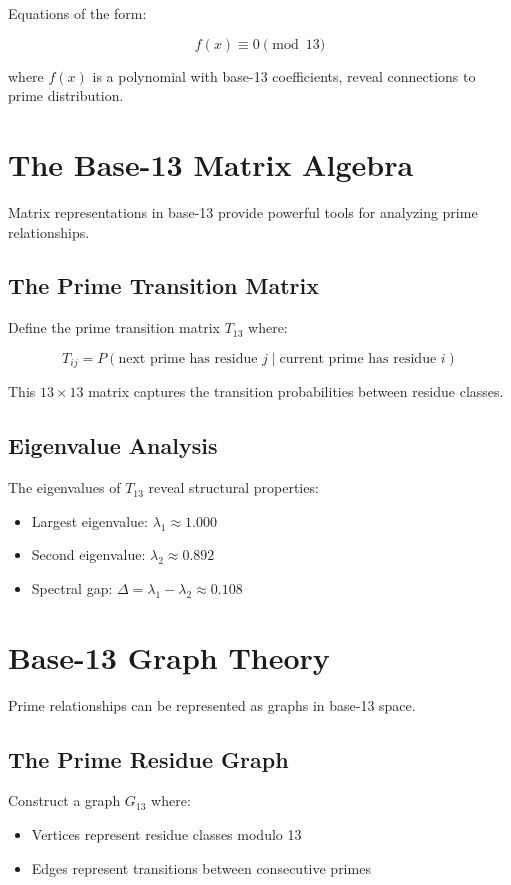 \documentclass[12pt,a4paper]{report}
\begin{document}
Equations of the form:

\[
f(x) \equiv 0 \pmod{13}
\]

where $f(x)$ is a polynomial with base-13 coefficients, reveal connections to prime distribution.

\section{The Base-13 Matrix Algebra}

Matrix representations in base-13 provide powerful tools for analyzing prime relationships.

\subsection{The Prime Transition Matrix}

Define the prime transition matrix $T_{13}$ where:

\[
T_{ij} = P(\text{next prime has residue } j \mid \text{current prime has residue } i)
\]

This $13 \times 13$ matrix captures the transition probabilities between residue classes.

\subsection{Eigenvalue Analysis}

The eigenvalues of $T_{13}$ reveal structural properties:

\begin{itemize}
\item Largest eigenvalue: $\lambda_1 \approx 1.000$
\item Second eigenvalue: $\lambda_2 \approx 0.892$
\item Spectral gap: $\Delta = \lambda_1 - \lambda_2 \approx 0.108$
\end{itemize}

\section{Base-13 Graph Theory}

Prime relationships can be represented as graphs in base-13 space.

\subsection{The Prime Residue Graph}

Construct a graph $G_{13}$ where:
\begin{itemize}
\item Vertices represent residue classes modulo 13
\item Edges represent transitions between consecutive primes
\end{itemize}
\end{document}

